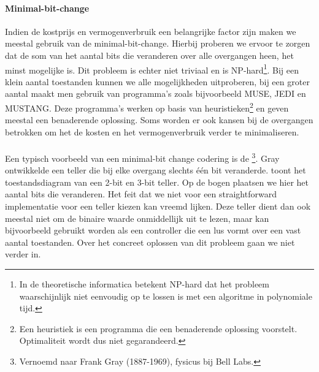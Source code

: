 \paragraph{Minimal-bit-change}
Indien de kostprijs en vermogenverbruik een belangrijke factor zijn maken we meestal gebruik van de minimal-bit-change. Hierbij proberen we ervoor te zorgen dat de som van het aantal bits die veranderen over alle overgangen heen, het minst mogelijke is. Dit probleem is echter niet triviaal en is NP-hard\footnote{In de theoretische informatica betekent NP-hard dat het probleem waarschijnlijk niet eenvoudig op te lossen is met een algoritme in polynomiale tijd.}. Bij een klein aantal toestanden kunnen we alle mogelijkheden uitproberen, bij een groter aantal maakt men gebruik van programma's zoals bijvoorbeeld \textsc{MUSE}, \textsc{JEDI} en \textsc{MUSTANG}. Deze programma's werken op basis van heuristieken\footnote{Een heuristiek is een programma die een benaderende oplossing voorstelt. Optimaliteit wordt dus niet gegarandeerd.} en geven meestal een benaderende oplossing. Soms worden er ook kansen bij de overgangen betrokken om het de kosten en het vermogenverbruik verder te minimaliseren.

\paragraph{}
Een typisch voorbeeld van een minimal-bit change codering is de \footnote{Vernoemd naar Frank Gray (1887-1969), fysicus bij Bell Labs.}. Gray ontwikkelde een teller die bij elke overgang slechts \'e\'en bit veranderde.  toont het toestandsdiagram van een 2-bit en 3-bit teller. Op de bogen plaatsen we hier het aantal bits die veranderen. Het feit dat we niet voor een straightforward implementatie voor een teller kiezen kan vreemd lijken. Deze teller dient dan ook meestal niet om de binaire waarde onmiddellijk uit te lezen, maar kan bijvoorbeeld gebruikt worden als een controller die een lus vormt over een vast aantal toestanden. Over het concreet oplossen van dit probleem gaan we niet verder in.


